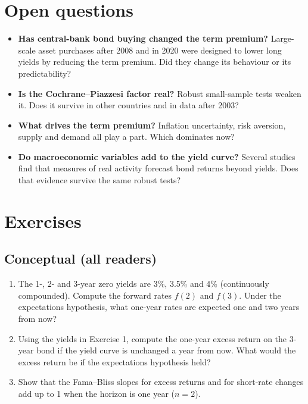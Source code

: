 \section{Open questions}
\label{sec:10-open}

\begin{itemize}
  \item \textbf{Has central-bank bond buying changed the term premium?} Large-scale asset purchases after 2008 and in 2020 were designed to lower long yields by reducing the term premium. Did they change its behaviour or its predictability?
  \item \textbf{Is the Cochrane--Piazzesi factor real?} Robust small-sample tests weaken it. Does it survive in other countries and in data after 2003?
  \item \textbf{What drives the term premium?} Inflation uncertainty, risk aversion, supply and demand all play a part. Which dominates now?
  \item \textbf{Do macroeconomic variables add to the yield curve?} Several studies find that measures of real activity forecast bond returns beyond yields. Does that evidence survive the same robust tests?
\end{itemize}

\section*{Exercises}

\subsection*{Conceptual (all readers)}

\begin{enumerate}
  \item The 1-, 2- and 3-year zero yields are 3\%, 3.5\% and 4\% (continuously compounded). Compute the forward rates $f(2)$ and $f(3)$. Under the expectations hypothesis, what one-year rates are expected one and two years from now?
  \item Using the yields in Exercise 1, compute the one-year excess return on the 3-year bond if the yield curve is unchanged a year from now. What would the excess return be if the expectations hypothesis held?
  \item Show that the Fama--Bliss slopes for excess returns and for short-rate changes add up to 1 when the horizon is one year ($n = 2$).
\end{enumerate}

